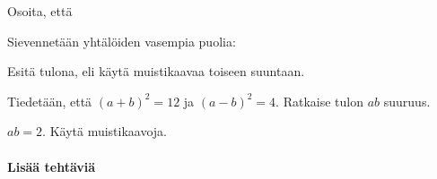 \begin{tehtavasivu}
\begin{tehtava}
    Osoita, että
    \begin{alakohdat}
    \end{alakohdat}
    \begin{vastaus}
    	Sievennetään yhtälöiden vasempia puolia:
        \begin{alakohdat}
        \end{alakohdat}
    \end{vastaus}
\end{tehtava}

\begin{tehtava}
    Esitä tulona, eli käytä muistikaavaa toiseen suuntaan.
    \begin{alakohdat}
    \end{alakohdat}
    \begin{vastaus}
        \begin{alakohdat}
        \end{alakohdat}
    \end{vastaus}
\end{tehtava}


\begin{tehtava}
	Tiedetään, että $(a+b)^2=12$ ja $(a-b)^2=4$. Ratkaise tulon $ab$ suuruus.
    \begin{vastaus}
	$ab = 2$. Käytä muistikaavoja.
    \end{vastaus}
\end{tehtava}


\paragraph*{Lisää tehtäviä}


\end{tehtavasivu}
